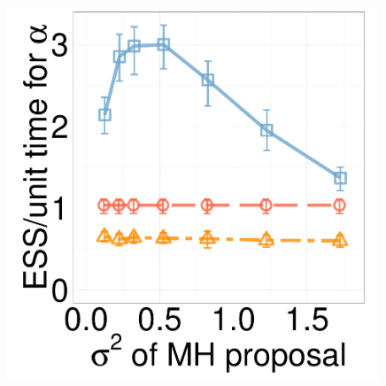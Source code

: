 
  \begin{figure}[H]
  \centering
  \begin{minipage}[!hp]{0.24\linewidth}
    \includegraphics [width=0.99\textwidth, angle=0]{figs/new_experiment_figs/cq_alpha_dim3_k2.pdf}
\end{minipage}
  \begin{minipage}[hp]{0.24\linewidth}
  \centering

\end{minipage}
\end{figure}
